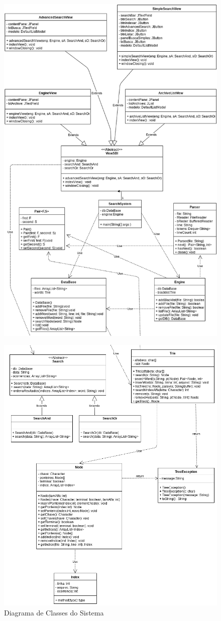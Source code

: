 \documentclass[12pt]{article}
\begin{document}
\begin{figure}[!h]
\centering
\includegraphics[width=.8\textwidth]{img/sbi_project-part1.png}
\end{figure}
\begin{figure}[!h]
\centering
\includegraphics[width=.8\textwidth]{img/sbi_project-part2.png}
\caption{Diagrama de Classes do Sistema}
\label{fig:diagramaDeClasses}
\end{figure}
  
\end{document}
